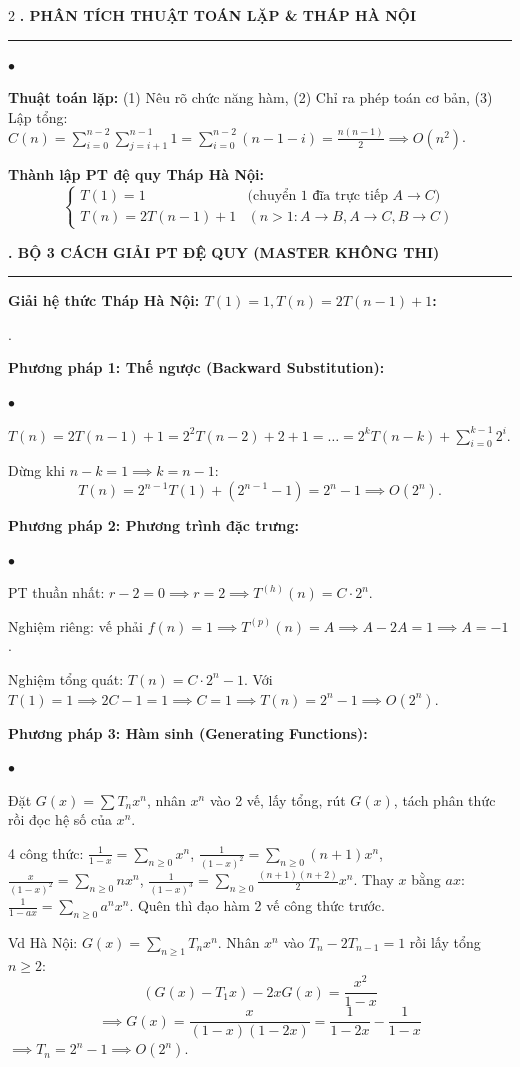 \documentclass[9pt,a4paper]{article}
\def\labelitemi{$\bullet$}
\renewenvironment{itemize}{%
  \begin{list}{\labelitemi}{%
    \setlength{\topsep}{0pt}%
    \setlength{\partopsep}{0pt}%
    \setlength{\itemsep}{0pt}%
    \setlength{\parsep}{0pt}%
    \setlength{\leftmargin}{10pt}%
  }%
}{\end{list}}
\renewenvironment{enumerate}{%
  \begin{list}{\arabic{enumi}.}{%
    \usecounter{enumi}%
    \setlength{\topsep}{0pt}%
    \setlength{\partopsep}{0pt}%
    \setlength{\itemsep}{0pt}%
    \setlength{\parsep}{0pt}%
    \setlength{\leftmargin}{10pt}%
  }%
}{\end{list}}
\newcommand{\mysec}[1]{\vspace{2pt}\textbf{\fontsize{9.5}{10.5}\selectfont #1}\vspace{1pt}\hrule\vspace{2pt}}
\begin{document}
\begin{multicols*}{2}
\mysec{5. PHÂN TÍCH THUẬT TOÁN LẶP \& THÁP HÀ NỘI}
\begin{itemize}
  \item \textbf{Thuật toán lặp:} (1) Nêu rõ chức năng hàm, (2) Chỉ ra phép toán cơ bản, (3) Lập tổng: $C(n) = \sum_{i=0}^{n-2} \sum_{j=i+1}^{n-1} 1 = \sum_{i=0}^{n-2}(n-1-i) = \frac{n(n-1)}{2} \implies O(n^2)$.
  \item \textbf{Thành lập PT đệ quy Tháp Hà Nội:}
    $$\begin{cases} T(1) = 1 & \text{(chuyển 1 đĩa trực tiếp } A \to C) \\ T(n) = 2T(n-1) + 1 & (n > 1: A \to B, A \to C, B \to C) \end{cases}$$
\end{itemize}

\columnbreak
\mysec{6. BỘ 3 CÁCH GIẢI PT ĐỆ QUY (MASTER KHÔNG THI)}
\textbf{Giải hệ thức Tháp Hà Nội: $T(1)=1, T(n)=2T(n-1)+1$:}
\begin{enumerate}
  \item \textbf{Phương pháp 1: Thế ngược (Backward Substitution):}
  \begin{itemize}
    \item $T(n) = 2T(n-1) + 1 = 2^2 T(n-2) + 2 + 1 = \dots = 2^k T(n-k) + \sum_{i=0}^{k-1} 2^i$.
    \item Dừng khi $n-k=1 \implies k=n-1$:
      $$T(n) = 2^{n-1}T(1) + (2^{n-1}-1) = 2^n - 1 \implies O(2^n).$$
  \end{itemize}
  \item \textbf{Phương pháp 2: Phương trình đặc trưng:}
  \begin{itemize}
    \item PT thuần nhất: $r - 2 = 0 \implies r = 2 \implies T^{(h)}(n) = C \cdot 2^n$.
    \item Nghiệm riêng: vế phải $f(n)=1 \implies T^{(p)}(n) = A \implies A - 2A = 1 \implies A = -1$.
    \item Nghiệm tổng quát: $T(n) = C \cdot 2^n - 1$. Với $T(1)=1 \implies 2C - 1 = 1 \implies C = 1 \implies T(n) = 2^n - 1 \implies O(2^n)$.
  \end{itemize}
  \item \textbf{Phương pháp 3: Hàm sinh (Generating Functions):}
  \begin{itemize}
    \item Đặt $G(x) = \sum T_n x^n$, nhân $x^n$ vào 2 vế, lấy tổng, rút $G(x)$, tách phân thức rồi đọc hệ số của $x^n$.
    \item 4 công thức: $\frac{1}{1-x} = \sum_{n \ge 0} x^n$, $\frac{1}{(1-x)^2} = \sum_{n \ge 0} (n+1) x^n$, $\frac{x}{(1-x)^2} = \sum_{n \ge 0} n x^n$, $\frac{1}{(1-x)^3} = \sum_{n \ge 0} \frac{(n+1)(n+2)}{2} x^n$. Thay $x$ bằng $ax$: $\frac{1}{1-ax} = \sum_{n \ge 0} a^n x^n$. Quên thì đạo hàm 2 vế công thức trước.
    \item Vd Hà Nội: $G(x) = \sum_{n \ge 1} T_n x^n$. Nhân $x^n$ vào $T_n - 2T_{n-1} = 1$ rồi lấy tổng $n \ge 2$:
      $$(G(x) - T_1 x) - 2x G(x) = \frac{x^2}{1-x}$$
      $$\implies G(x) = \frac{x}{(1-x)(1-2x)} = \frac{1}{1-2x} - \frac{1}{1-x}$$
      $\implies T_n = 2^n - 1 \implies O(2^n)$.
  \end{itemize}
\end{enumerate}


\end{multicols*}
\end{document}
